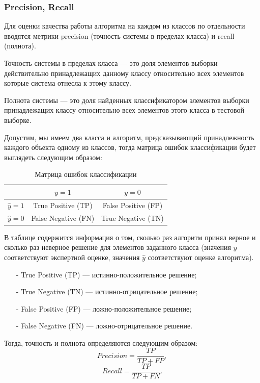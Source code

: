 \documentclass[14pt, a4paper, oneside]{extarticle}
\begin{document}
\subsubsection{Precision, Recall}
Для оценки качества работы алгоритма на каждом из классов по отдельности вводятся метрики precision (точность системы в пределах класса) и recall (полнота).

Точность системы в пределах класса --- это доля элементов выборки действительно принадлежащих данному классу относительно всех элементов которые система отнесла к этому классу.

Полнота системы --- это доля найденных классификатором элементов выборки принадлежащих классу относительно всех элементов этого класса в тестовой выборке.

Допустим, мы имеем два класса и алгоритм, предсказывающий принадлежность каждого объекта одному из классов, тогда матрица ошибок классификации будет выглядеть следующим образом:

\begin{table}[H]
    \centering
    \caption{Матрица ошибок классификации}
    \begin{tabular}{ |c|c|c| }
        \hline
        & $y=1$ & $y=0$ \\
        \hline
        $\hat{y}=1$ & True Positive (TP) & False Positive (FP) \\
        \hline
        $\hat{y}=0$ & False Negative (FN) & True Negative (TN) \\
        \hline
    \end{tabular}
\end{table}

В таблице содержится информация о том, сколько раз алгоритм принял верное и сколько раз неверное решение для элементов заданного класса (значения $y$ соответствуют экспертной оценке, значения $\hat{y}$ соответствуют оценке алгоритма).

\begin{itemize}
    \item[-] True Positive (TP) --- истинно-положительное решение;
    \item[-] True Negative (TN) --- истинно-отрицательное решение;
    \item[-] False Positive (FP) --- ложно-положительное решение;
    \item[-] False Negative (FN) --- ложно-отрицательное решение.
\end{itemize}

Тогда, точность и полнота определяются следующим образом:
$$Precision = \frac{TP}{TP+FP},$$
$$Recall = \frac{TP}{TP+FN}.$$
\end{document}
